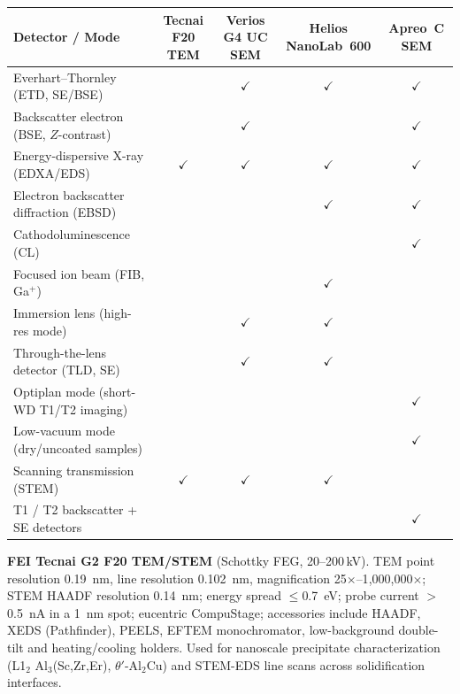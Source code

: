 \documentclass[11pt,letterpaper]{article}
\begin{document}
\begin{center}\small
\begin{tabular}{@{}lcccc@{}}
\toprule
Detector / Mode & Tecnai F20 TEM & Verios G4 UC SEM & Helios NanoLab~600 & Apreo~C SEM \\
\midrule
Everhart--Thornley (ETD, SE/BSE)         &              & $\checkmark$ & $\checkmark$ & $\checkmark$ \\
Backscatter electron (BSE, $Z$-contrast) &              & $\checkmark$ &              & $\checkmark$ \\
Energy-dispersive X-ray (EDXA/EDS)       & $\checkmark$ & $\checkmark$ & $\checkmark$ & $\checkmark$ \\
Electron backscatter diffraction (EBSD)  &              &              & $\checkmark$ & $\checkmark$ \\
Cathodoluminescence (CL)                 &              &              &              & $\checkmark$ \\
Focused ion beam (FIB, Ga$^{+}$)         &              &              & $\checkmark$ &              \\
Immersion lens (high-res mode)           &              & $\checkmark$ & $\checkmark$ &              \\
Through-the-lens detector (TLD, SE)      &              & $\checkmark$ & $\checkmark$ &              \\
Optiplan mode (short-WD T1/T2 imaging)   &              &              &              & $\checkmark$ \\
Low-vacuum mode (dry/uncoated samples)   &              &              &              & $\checkmark$ \\
Scanning transmission (STEM)             & $\checkmark$ & $\checkmark$ & $\checkmark$ &              \\
T1 / T2 backscatter + SE detectors       &              &              &              & $\checkmark$ \\
\bottomrule
\end{tabular}
\end{center}

\smallskip
\noindent\textbf{FEI Tecnai G2 F20 TEM/STEM} (Schottky FEG, 20--200\,kV).
TEM point resolution 0.19~nm, line resolution 0.102~nm, magnification
25$\times$--1{,}000{,}000$\times$; STEM HAADF resolution 0.14~nm; energy
spread $\leq$0.7~eV; probe current $>$0.5~nA in a 1~nm spot; eucentric
CompuStage; accessories include HAADF, XEDS (Pathfinder), PEELS, EFTEM
monochromator, low-background double-tilt and heating/cooling holders.
Used for nanoscale precipitate characterization (L1$_2$ Al$_3$(Sc,Zr,Er),
$\theta'$-Al$_2$Cu) and STEM-EDS line scans across solidification
interfaces.
\end{document}
